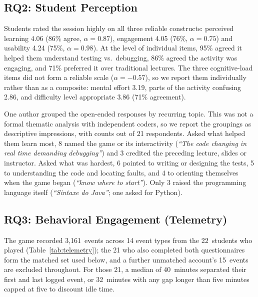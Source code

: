 \documentclass[conference]{IEEEtran}
\begin{document}
\subsection{RQ2: Student Perception}

Students rated the session highly on all three reliable constructs: perceived learning 4.06 (86\% agree, $\alpha = 0.87$), engagement 4.05 (76\%, $\alpha = 0.75$) and usability 4.24 (75\%, $\alpha = 0.98$).
At the level of individual items, 95\% agreed it helped them understand testing vs.\ debugging, 86\% agreed the activity was engaging, and 71\% preferred it over traditional lectures.
The three cognitive-load items did not form a reliable scale ($\alpha = -0.57$), so we report them individually rather than as a composite: mental effort 3.19, parts of the activity confusing 2.86, and difficulty level appropriate 3.86 (71\% agreement).

One author grouped the open-ended responses by recurring topic. This was not a formal thematic analysis with independent coders, so we report the groupings as descriptive impressions, with counts out of 21 respondents.
Asked what helped them learn most, 8 named the game or its interactivity (\emph{``The code changing in real time demanding debugging''}) and 3 credited the preceding lecture, slides or instructor.
Asked what was hardest, 6 pointed to writing or designing the tests, 5 to understanding the code and locating faults, and 4 to orienting themselves when the game began (\emph{``know where to start''}). Only 3 raised the programming language itself (\emph{``Sintaxe do Java''}; one asked for Python).

\subsection{RQ3: Behavioral Engagement (Telemetry)}

The game recorded 3,161~events across 14 event types from the 22~students who played (Table~\ref{tab:telemetry}); the 21 who also completed both questionnaires form the matched set used below, and a further unmatched account's 15~events are excluded throughout.
For those 21, a median of 40~minutes separated their first and last logged event, or 32~minutes with any gap longer than five minutes capped at five to discount idle time.
\end{document}
